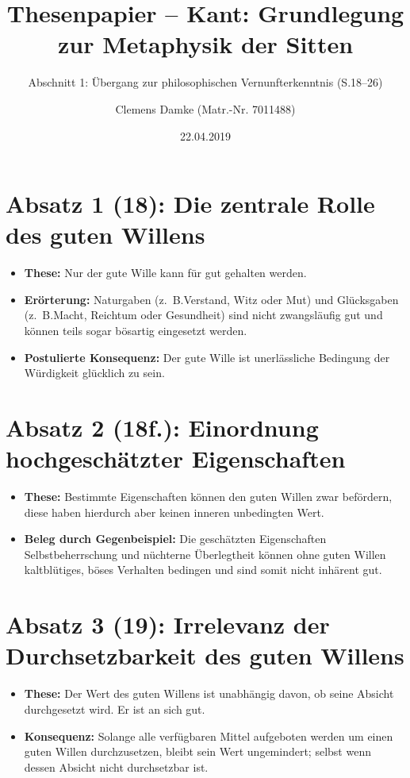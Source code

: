 \documentclass{llncs}
\begin{document}
\pagestyle{plain}

\title{Thesenpapier – Kant: Grundlegung zur Metaphysik der Sitten}
\subtitle{Abschnitt 1: Übergang zur philosophischen Vernunfterkenntnis (S.\@ 18--26)}
\author{Clemens Damke (Matr.-Nr. 7011488)}
\date{22.04.2019}
\maketitle

\section*{Absatz 1 (18): Die zentrale Rolle des guten Willens}

\begin{itemize}
    \item \textbf{These:} Nur der gute Wille kann für gut gehalten werden.
    \item \textbf{Erörterung:} Naturgaben (z.~B.\@ Verstand, Witz oder Mut) und Glücksgaben (z.~B.\@ Macht, Reichtum oder Gesundheit) sind nicht zwangsläufig gut und können teils sogar bösartig eingesetzt werden.
    \item \textbf{Postulierte Konsequenz:} Der gute Wille ist unerlässliche Bedingung der Würdigkeit glücklich zu sein.
\end{itemize}

\section*{Absatz 2 (18f.): Einordnung hochgeschätzter Eigenschaften}

\begin{itemize}
    \item \textbf{These:} Bestimmte Eigenschaften können den guten Willen zwar befördern, diese haben hierdurch aber keinen inneren unbedingten Wert.
    \item \textbf{Beleg durch Gegenbeispiel:} Die geschätzten Eigenschaften Selbstbeherrschung und nüchterne Überlegtheit können ohne guten Willen kaltblütiges, böses Verhalten bedingen und sind somit nicht inhärent gut.
\end{itemize}

\section*{Absatz 3 (19): Irrelevanz der Durchsetzbarkeit des guten Willens}

\begin{itemize}
    \item \textbf{These:} Der Wert des guten Willens ist unabhängig davon, ob seine Absicht durchgesetzt wird.
		Er ist an sich gut.
    \item \textbf{Konsequenz:} Solange alle verfügbaren Mittel aufgeboten werden um einen guten Willen durchzusetzen, bleibt sein Wert ungemindert;
		selbst wenn dessen Absicht nicht durchsetzbar ist.
\end{itemize}
\end{document}
